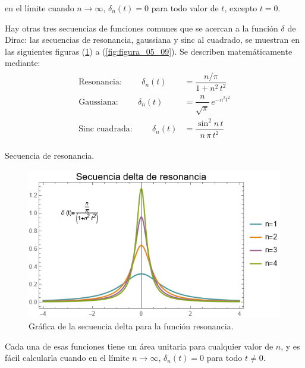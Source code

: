 \documentclass[12pt]{article}
\numberwithin{equation}{section}
\begin{document}
en el límite cuando $n \to \infty$, $\delta_{n}(t) = 0$ para todo valor de $t$, excepto $t = 0$. 
\par
Hay otras tres secuencias de funciones comunes que se acercan a la función $\delta$ de Dirac: las secuencias de resonancia, gaussiana y sinc al cuadrado, se muestran en las siguientes figuras (\ref{fig:figura_05_07}) a (\ref{fig:figura_05_09}). Se describen matemáticamente mediante:
\begin{align}
\begin{aligned}
\mbox{Resonancia:} \hspace{1cm} \delta_{n}(t) &= \dfrac{n/\pi}{1 + n^{2} \, t^{2}} \\[1em]
\mbox{Gaussiana:} \hspace{1cm} \delta_{n}(t) &= \dfrac{n}{\sqrt{\pi}} \, e^{-n^{2} t^{2}} \\[1em]
\mbox{Sinc cuadrada:} \hspace{1cm} \delta_{n}(t) &= \dfrac{\sin^{2} n \, t}{n \, \pi \, t^{2}} 
\end{aligned}
\label{eq:ecuacion_05_13}
\end{align}

Secuencia de resonancia.
\begin{figure}[H]
    \centering
    \includegraphics[scale=1]{Imagenes/secuencia_Delta_05.png}
    \caption{Gráfica de la secuencia delta para la función resonancia.}
    \label{fig:figura_05_07}
\end{figure}
Cada una de esas funciones tiene un área unitaria para cualquier valor de $n$, y es fácil calcularla cuando en el límite $n \to \infty$, $\delta_{n} (t) = 0$ para todo $t \neq 0$.
\end{document}
